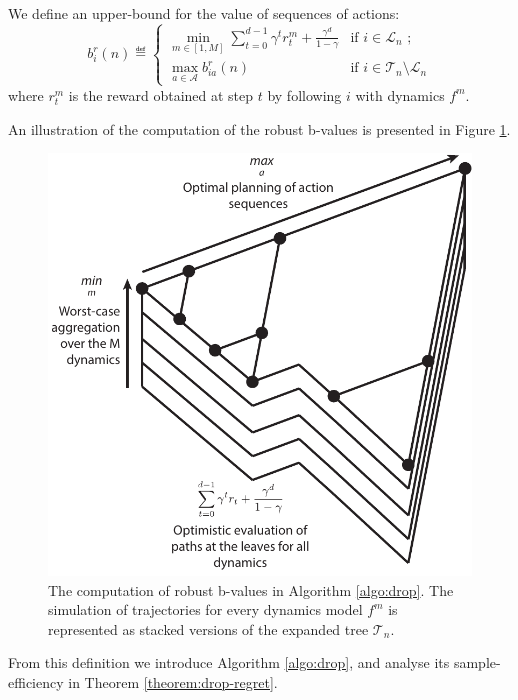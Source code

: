 \documentclass{article}
\begin{document}
\begin{definition} We define an upper-bound for the value of sequences of actions:
\begin{equation}
\label{eq:robust_sequence_ucb}
b_i^r(n)  \eqdef
\begin{cases}
\min_{m\in[1, M]} \sum_{t=0}^{d-1} \gamma^t r_t^m  + \frac{\gamma^d}{1-\gamma} &\text{if } i \in \mathcal{L}_n \text{ ;}\\
\max_{a\in\mathcal{A}} b_{ia}^r(n) & \text{if } i \in \mathcal{T}_n \setminus \mathcal{L}_n 
\end{cases}
\end{equation}
where $r_t^m$ is the reward obtained at step $t$ by following $i$ with dynamics $f^m$.
\end{definition}
An illustration of the computation of the robust b-values is presented in Figure \ref{fig:drop}.

\begin{figure}
\centering
\includegraphics[width=0.4\linewidth]{img/robust-control-tree}
\caption{The computation of robust b-values in Algorithm \ref{algo:drop}. The simulation of trajectories for every dynamics model $f^m$ is represented as stacked versions of the expanded tree $\mathcal{T}_n$.}
\label{fig:drop}
\end{figure}

From this definition we introduce Algorithm \ref{algo:drop}, and analyse its sample-efficiency in Theorem \ref{theorem:drop-regret}.

\end{document}
